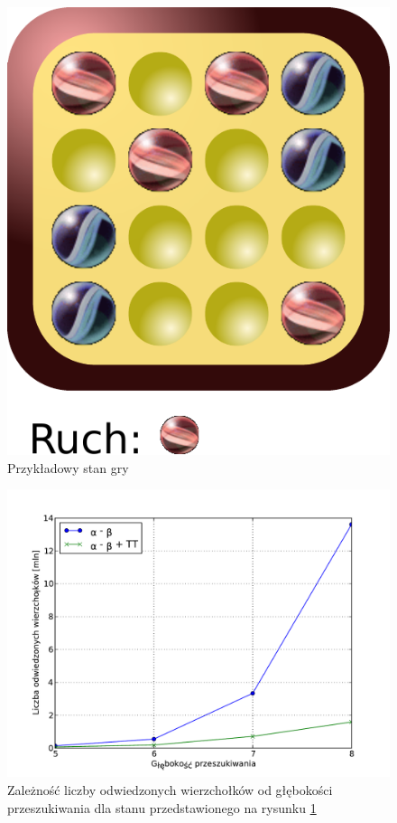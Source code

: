 \documentclass{scrartcl}
\begin{document}
\begin{figure}[h]
  \centering
  \includegraphics[scale=0.6]{data/position1.pdf}
  \caption{Przykładowy stan gry}
  \label{fig:position1}
\end{figure}

\begin{table}[h]
  \centering
  \caption{Zestawienie wyników  pomiarów wydajności algorytmów dla stanu
    przedstawionego na rysunku \ref{fig:position1}}
  \label{table:position1}
  
\end{table}

\begin{figure}[h]
  \centering
  \includegraphics[scale=0.5]{data/results1.pdf}
  \caption{Zależność liczby odwiedzonych wierzchołków od głębokości
    przeszukiwania dla stanu przedstawionego na rysunku
    \ref{fig:position1}}
  \label{fig:results1}
\end{figure}
\end{document}
